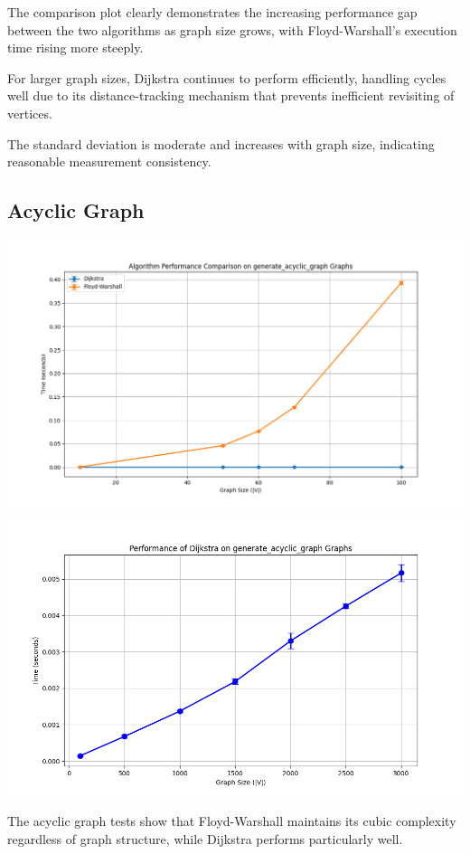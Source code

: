 \documentclass[a4paper,12pt]{article}
\begin{document}
The comparison plot clearly demonstrates the increasing performance gap between the two algorithms as graph size grows, with Floyd-Warshall's execution time rising more steeply.

For larger graph sizes, Dijkstra continues to perform efficiently, handling cycles well due to its distance-tracking mechanism that prevents inefficient revisiting of vertices.

The standard deviation is moderate and increases with graph size, indicating reasonable measurement consistency.
\subsection{Acyclic Graph}
\label{sec:orgaf10d7d}
\begin{center}
\includegraphics[width=.9\linewidth]{dijkstra_floyd_acyclic.png}
\label{orgb47f5c1}
\end{center}
\begin{center}
\includegraphics[width=.9\linewidth]{dijkstra_acyclic.png}
\label{org1c4bc59}
\end{center}

The acyclic graph tests show that Floyd-Warshall maintains its cubic complexity regardless of graph structure, while Dijkstra performs particularly well.
\end{document}
